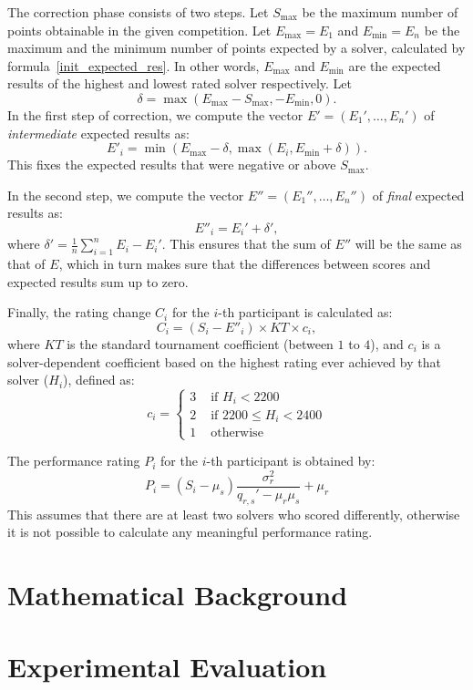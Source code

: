 \documentclass{article}
\newcommand{\artg}{\mu_r}
\newcommand{\ascr}{\mu_s}
\newcommand{\vrtg}{\sigma_r}
\newcommand{\cov}{q_{r,s}}
\begin{document}
The correction phase consists of two steps.
Let $S_{\max}$ be the maximum number of points obtainable in the given competition.
Let $E_{\max}=E_1$ and $E_{\min}=E_n$ be the maximum and the minimum
number of points expected by a solver,
calculated by formula~\eqref{init_expected_res}.
In other words, $E_{\max}$ and $E_{\min}$ are the expected results
of the highest and lowest rated solver respectively.
Let 
\begin{equation}
\delta = \max(E_{\max}-S_{\max}, -E_{\min}, 0).
\end{equation}
In the first step of correction, we compute the vector $E'=(E_1',\ldots,E_n')$ of \emph{intermediate} expected results as:
\begin{equation}
E'_i = \min (E_{\max}-\delta, \max(E_i, E_{\min}+\delta)).
\end{equation}
This fixes the expected results that were negative or above $S_{\max}$.

In the second step, we compute the vector $E''=(E_1'',\ldots,E_n'')$ of \emph{final} expected results as:
\begin{equation}
E''_i=E_i' + \delta',
\end{equation}
where $\delta'=\frac{1}{n}\sum_{i=1}^n E_i-E_i'$.
This ensures that the sum of $E''$ will be the same as that of $E$, which in turn makes sure that the differences between scores and expected results sum up to zero.

Finally, the rating change $C_i$ for the $i$-th participant is calculated as:
\begin{equation}
C_i = (S_i - E''_i)\times KT\times c_i,
\end{equation}
where $KT$ is the standard tournament coefficient (between $1$ to $4$), and $c_i$ is a solver-dependent coefficient based on the highest rating ever achieved by that solver ($H_i$), defined as:
\begin{equation}
c_i=\begin{cases}
3&\text{ if } H_i<2200\\
2&\text{ if } 2200\leq H_i<2400\\
1&\text{ otherwise }
\end{cases}
\end{equation}

The performance rating $P_i$ for the $i$-th participant is obtained by:
\begin{equation}
P_i = (S_i - \ascr) \frac{\vrtg^2}{\cov'-\artg\ascr} + \artg
\end{equation}
This assumes that there are at least two solvers who scored differently, otherwise it is not possible to calculate any meaningful performance rating.

\section{Mathematical Background}

\section{Experimental Evaluation}
\end{document}
